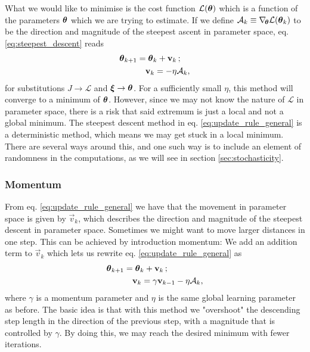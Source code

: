         What we would like to minimise is the cost function $\mathcal{L}(\boldsymbol{\theta})$ which is a function of the parameters $\boldsymbol{\theta}$ which we are trying to estimate. If we define $\mathcal{A}_k \equiv \nabla_{\!\boldsymbol{\theta}} \mathcal{L}(\boldsymbol{\theta}_k)$ to be the direction and magnitude of the steepest ascent in parameter space, eq. \eqref{eq:steepest_descent} reads 
        \begin{equation}\label{eq:update_rule_general}
            \begin{split}
                \boldsymbol{\theta}_{k+1} &= \boldsymbol{\theta}_k + \mathbf{v}_k\,;  \\
                &\quad \mathbf{v}_k = -\eta\mathcal{A}_k,
            \end{split}
        \end{equation}
        for substitutions $J\to\mathcal{L}$ and $\boldsymbol{\xi}\to \boldsymbol{\theta}$. For a sufficiently small $\eta$, this method will converge to a minimum of $\boldsymbol{\theta}$. However, since we may not know the nature of $\mathcal{L}$ in parameter space, there is a risk that said extremum is just a local and not a global minimum. The steepest descent method in eq. \eqref{eq:update_rule_general} is a deterministic method, which means we may get stuck in a local minimum. There are several ways around this, and one such way is to include an element of randomness in the computations, as we will see in section \ref{sec:stochasticity}.

    \subsubsection{Momentum}\label{sec:momentum}
        From eq. \eqref{eq:update_rule_general} we have that the movement in parameter space is given by $\vec{v}_k$, which describes the direction and magnitude of the steepest descent in parameter space. Sometimes we might want to move larger distances in one step. This can be achieved by introduction momentum: We add an addition term to $\vec{v}_k$ which lets us rewrite eq. \eqref{eq:update_rule_general} as
        \begin{equation}\label{eq:momentum_GD_algorithm}
            \begin{split}
                \boldsymbol{\theta}_{k+1} &= \boldsymbol{\theta}_k + \mathbf{v}_k\, ; \\
                &\quad \mathbf{v}_k =\gamma\mathbf{v}_{k-1} - \eta\mathcal{A}_k,
            \end{split}
        \end{equation}
        where $\gamma$ is a momentum parameter and $\eta$ is the same global learning parameter as before. The basic idea is that with this method we "overshoot" the descending step length in the direction of the previous step, with a magnitude that is controlled by $\gamma$. By doing this, we may reach the desired minimum with fewer iterations. 

